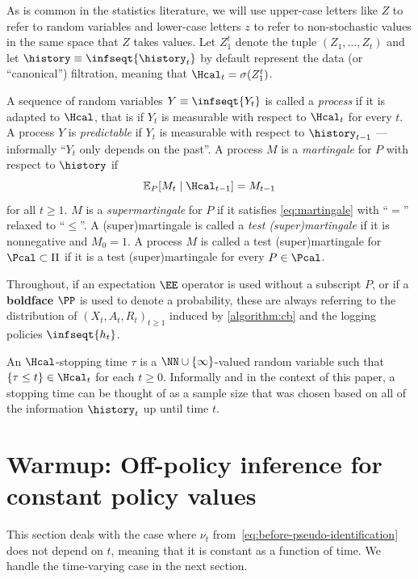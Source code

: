 As is common in the statistics literature, we will use upper-case letters like $Z$ to refer to random variables and lower-case letters $z$ to refer to non-stochastic values in the same space that $Z$ takes values.
Let $Z_1^t$ denote the tuple $(Z_1,\dots,Z_t)$ and let $\history \equiv \infseqt{\history_t}$ by default represent the data (or ``canonical'') filtration, meaning that $\Hcal_t=\sigma(Z_1^t)$. 


A sequence of random variables $Y \equiv \infseqt{Y_t}$ is called a \textit{process} if it is adapted to $\Hcal$, that is if $Y_t$ is measurable with respect to $\Hcal_t$ for every $t$. A process $Y$ is \emph{predictable} if $Y_t$ is measurable with respect to $\history_{t-1}$ --- informally ``$Y_t$ only depends on the past''. A process $M$ is a \emph{martingale} for $P$ with respect to $\history$ if \begin{equation}\label{eq:martingale}
    \mathbb{E}_P[M_t \mid \Hcal_{t-1}] = M_{t-1} 
\end{equation}
for all $t\geq 1$. $M$ is a \emph{supermartingale} for $P$ if it satisfies \eqref{eq:martingale} with ``$=$'' relaxed to ``$\leq$''.  A (super)martingale is called a \emph{test (super)martingale} if it is nonnegative and $M_0=1$. A process $M$ is called a test (super)martingale for $\Pcal \subset \Pi$ if it is a test (super)martingale for every $P \in \Pcal$. 

Throughout, if an expectation $\EE$ operator is used without a subscript $P$, or if a \textbf{boldface} $\PP$ is used to denote a probability, these are always referring to the  distribution of $(X_t,A_t,R_t)_{t \geq 1}$ induced by \cref{algorithm:cb} and the logging policies $\infseqt{h_t}$.

An $\Hcal$-stopping time $\tau$ is a $\NN \cup \{\infty\}$-valued random variable such that $\{\tau \leq t\} \in \Hcal_t$ for each $t \geq 0$. Informally and in the context of this paper, a stopping time can be thought of as a sample size that was chosen based on all of the information $\history_t$ up until time $t$.

\section{Warmup: Off-policy inference for constant policy values}\label{section:warmup}

This section deals with the case where $\nu_t$ from~\eqref{eq:before-pseudo-identification} does not depend on $t$, meaning that it is constant as a function of time. We handle the time-varying case in the next section.

